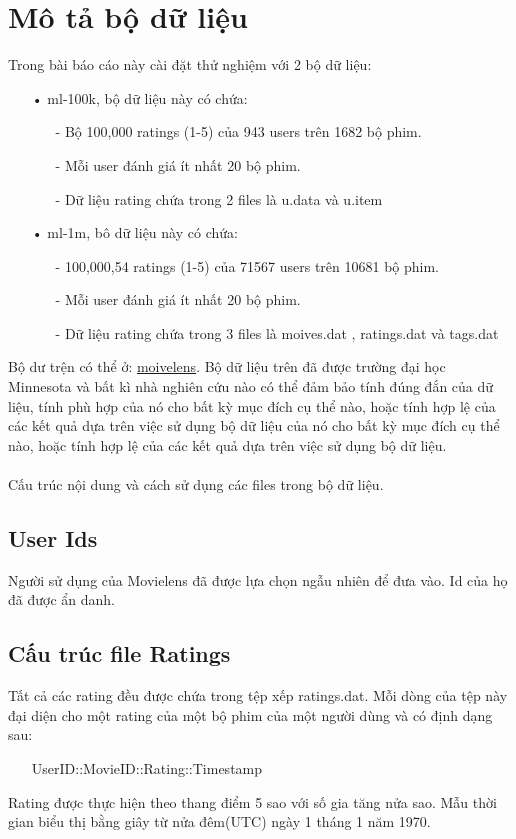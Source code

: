 \documentclass[a4paper,10pt]{report}
\begin{document}
\section{Mô tả bộ dữ liệu}
Trong bài báo cáo này cài đặt thử nghiệm với 2 bộ dữ liệu:
\begin{itemize}
\item[•] ml-100k, bộ dữ liệu này có chứa:
\begin{itemize}
\item[-] Bộ 100,000 ratings (1-5) của 943 users trên 1682 bộ phim.
\item[-] Mỗi user đánh giá ít nhất 20 bộ phim.
\item[-] Dữ liệu rating chứa trong 2 files là u.data và u.item
\end{itemize}
\item[•] ml-1m, bô dữ liệu này có chứa:
\begin{itemize}
\item[-] 100,000,54 ratings (1-5) của 71567 users trên 10681 bộ phim.
\item[-] Mỗi user đánh giá ít nhất 20 bộ phim.
\item[-] Dữ liệu rating chứa trong 3 files là moives.dat , ratings.dat và tags.dat
\end{itemize}
\end{itemize}
Bộ dư trện có thể ở: \href{https://grouplens.org/datasets/movielens/}{moivelens}. Bộ dữ liệu trên đã được trường đại học Minnesota và bất kì nhà nghiên cứu nào có thể đảm bảo tính đúng đắn của dữ liệu, tính phù hợp của nó cho bất kỳ mục đích cụ thể nào, hoặc tính hợp lệ của các kết quả dựa trên việc sử dụng bộ dữ liệu của nó cho bất kỳ mục đích cụ thể nào, hoặc tính hợp lệ của các kết quả dựa trên việc sử dụng bộ dữ liệu.\\ \\
Cấu trúc nội dung và cách sử dụng các files trong bộ dữ liệu.
\subsection{User Ids}
Người sử dụng của Movielens đã được lựa chọn ngẫu nhiên để đưa vào. Id của họ đã được ẩn danh. 
\subsection{Cấu trúc file Ratings}
Tất cả các rating đều được chứa trong tệp xếp ratings.dat. Mỗi dòng của tệp này đại diện cho một rating của một bộ phim của một người dùng và có định dạng sau:
\begin{itemize}
\item[] UserID::MovieID::Rating::Timestamp
\end{itemize}
Rating được thực hiện theo thang điểm 5 sao với số gia tăng nửa sao. Mẫu thời gian biểu thị bằng giây từ nửa đêm(UTC) ngày 1 tháng 1 năm 1970.
\newpage
\end{document}
